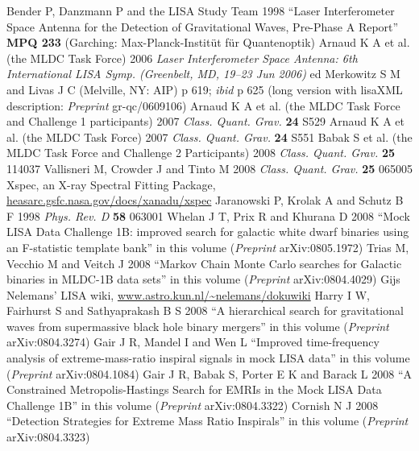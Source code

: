 \documentclass{iopart}
\begin{document}
\begin{thebibliography}{99}
%
 Bender P, Danzmann P and the LISA Study Team 1998 ``Laser Interferometer Space Antenna for the Detection of Gravitational Waves, Pre-Phase A Report'' \textbf{MPQ 233} (Garching: Max-Planck-Instit\"ut f\"ur Quantenoptik) 
%
 Arnaud K A et al. (the MLDC Task Force) 2006 \textit{Laser Interferometer Space Antenna: 6th International LISA Symp. (Greenbelt, MD, 19--23 Jun 2006)} ed Merkowitz S M and Livas J C (Melville, NY: AIP) p 619; \textit{ibid} p 625 (long version with lisaXML description: \textit{Preprint} gr-qc/0609106)
%
 Arnaud K A et al. (the MLDC Task Force and Challenge 1 participants) 2007 \textit{Class. Quant. Grav.} \textbf{24} S529
%
 Arnaud K A et al. (the MLDC Task Force) 2007 \textit{Class. Quant. Grav.} \textbf{24} S551
%
 Babak S et al. (the MLDC Task Force and Challenge 2 Participants) 2008 \textit{Class. Quant. Grav.} \textbf{25} 114037
%
 Vallisneri M, Crowder J and Tinto M 2008 \textit{Class. Quant. Grav.} \textbf{25} 065005
%
 Xspec, an X-ray Spectral Fitting Package, \url{heasarc.gsfc.nasa.gov/docs/xanadu/xspec}
%
 Jaranowski P, Krolak A and Schutz B F 1998 \textit{Phys. Rev. D} \textbf{58} 063001
%
 Whelan J T, Prix R and Khurana D 2008 ``Mock LISA Data Challenge 1B: improved search for galactic white dwarf binaries using an F-statistic template bank'' in this volume (\textit{Preprint} arXiv:0805.1972)
%
 Trias M, Vecchio M and Veitch J 2008
``Markov Chain Monte Carlo searches for Galactic binaries in MLDC-1B data sets'' in this volume (\textit{Preprint} arXiv:0804.4029)
%
 Gijs Nelemans' LISA wiki, \url{www.astro.kun.nl/~nelemans/dokuwiki}
%
 Harry I W, Fairhurst S and Sathyaprakash B S 2008 ``A hierarchical search for gravitational waves from supermassive black hole binary mergers'' in this volume (\textit{Preprint} arXiv:0804.3274)
%
 Gair J R, Mandel I and Wen L
``Improved time-frequency analysis of extreme-mass-ratio inspiral signals in mock LISA data'' in this volume (\textit{Preprint} arXiv:0804.1084)
%
Gair J R, Babak S, Porter E K and Barack L 2008 ``A Constrained Metropolis-Hastings Search for EMRIs in the Mock LISA Data Challenge 1B'' in this volume (\textit{Preprint} arXiv:0804.3322)
%
 Cornish N J 2008 ``Detection Strategies for Extreme Mass Ratio Inspirals'' in this volume (\textit{Preprint} arXiv:0804.3323)

\end{thebibliography}
\end{document}
